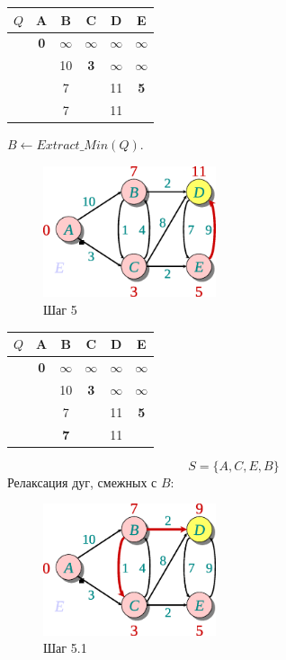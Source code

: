 \documentclass[11pt]{article}
\begin{document}
\begin{center}
\begin{tabular}{|r|c|c|c|c|c|}
  \hline
     $Q$ & A & \textbf{B} & C & \textbf{D} & E \\
  \hline
         & \textbf{0} & $\infty$ & $\infty$ & $\infty$ & $\infty$ \\
  \hline
         & & 10 & \textbf{3} & $\infty$ & $\infty$ \\
  \hline
         & & 7 & & 11 & \textbf{5} \\
  \hline
         & & 7 & & 11 & \\
  \hline
\end{tabular}
\end{center}
\newpage
$B \leftarrow Extract\_Min(Q)$.
\begin{figure}[h!]
  \centering
  \includegraphics[width=2in]{lecture17/dijkstra5.eps}
  \caption{Шаг 5}
\end{figure}
\begin{center}
\begin{tabular}{|r|c|c|c|c|c|}
  \hline
     $Q$ & A & B & C & \textbf{D} & E \\
  \hline
         & \textbf{0} & $\infty$ & $\infty$ & $\infty$ & $\infty$ \\
  \hline
         & & 10 & \textbf{3} & $\infty$ & $\infty$ \\
  \hline
         & & 7 & & 11 & \textbf{5} \\
  \hline
         & & \textbf{7} & & 11 & \\
  \hline
\end{tabular}
\end{center}
\begin{equation*}
  S = \{A, C, E, B\}
\end{equation*}
Релаксация дуг, смежных с $B$:
\begin{figure}[h!]
  \centering
  \includegraphics[width=2in]{lecture17/dijkstra51.eps}
  \caption{Шаг 5.1}
\end{figure}
\end{document}

